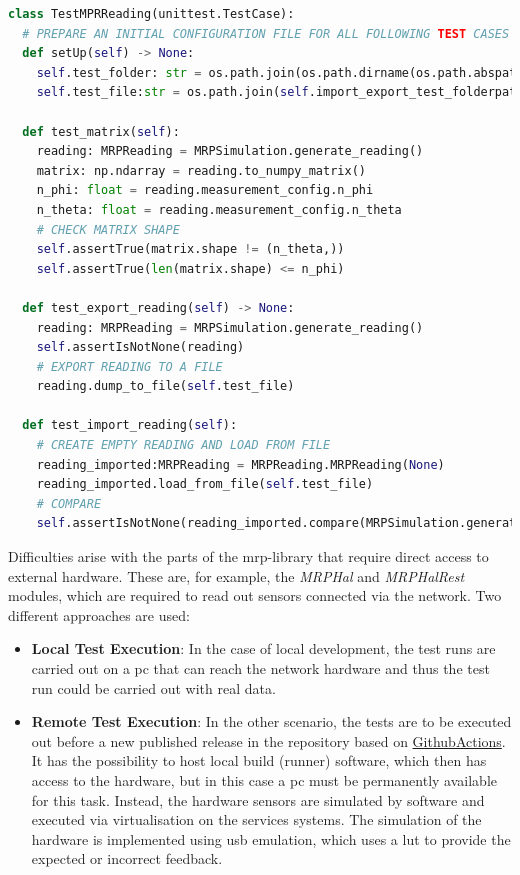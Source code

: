 \begin{lstlisting}[language=Python, caption={Example of a PyTest class for testing the internal functions of the MRPReading and MRPSimulation modules}, label=lst:pytest_example_code]
class TestMPRReading(unittest.TestCase):
  # PREPARE AN INITIAL CONFIGURATION FILE FOR ALL FOLLOWING TEST CASES IN THIS FILE
  def setUp(self) -> None:
    self.test_folder: str = os.path.join(os.path.dirname(os.path.abspath(__file__)), "tmp")
    self.test_file:str = os.path.join(self.import_export_test_folderpath, "tmp")

  def test_matrix(self):
    reading: MRPReading = MRPSimulation.generate_reading()
    matrix: np.ndarray = reading.to_numpy_matrix()
    n_phi: float = reading.measurement_config.n_phi
    n_theta: float = reading.measurement_config.n_theta
    # CHECK MATRIX SHAPE
    self.assertTrue(matrix.shape != (n_theta,))
    self.assertTrue(len(matrix.shape) <= n_phi)

  def test_export_reading(self) -> None:
    reading: MRPReading = MRPSimulation.generate_reading()
    self.assertIsNotNone(reading)
    # EXPORT READING TO A FILE
    reading.dump_to_file(self.test_file)

  def test_import_reading(self):
    # CREATE EMPTY READING AND LOAD FROM FILE
    reading_imported:MRPReading = MRPReading.MRPReading(None)
    reading_imported.load_from_file(self.test_file)
    # COMPARE
    self.assertIsNotNone(reading_imported.compare(MRPSimulation.generate_reading()))
\end{lstlisting}

Difficulties arise with the parts of the \gls{mrp}-library that require
direct access to external hardware. These are, for example, the
\emph{MRPHal} and \emph{MRPHalRest} modules, which are required to read
out sensors connected via the network. Two different approaches are
used:

\begin{itemize}
\item
  \textbf{Local Test Execution}: In the case of local development, the
  test runs are carried out on a \gls{pc} that can reach the network
  hardware and thus the test run could be carried out with real data.
\item
  \textbf{Remote Test Execution}: In the other scenario, the tests are
  to be executed out before a new published release in the repository
  based on \href{https://github.com/features/actions}{GithubActions}. It
  has the possibility to host local build (runner) software, which then
  has access to the hardware, but in this case a \gls{pc} must be
  permanently available for this task. Instead, the hardware sensors are
  simulated by software and executed via virtualisation on the services
  systems. The simulation of the hardware is implemented using \gls{usb}
  emulation, which uses a \gls{lut} to provide the expected or incorrect
  feedback.
\end{itemize}

